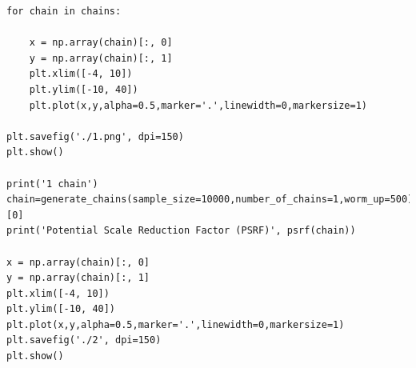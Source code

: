 \documentclass{article}
\begin{document}
\begin{verbatim}
for chain in chains:

    x = np.array(chain)[:, 0]
    y = np.array(chain)[:, 1]
    plt.xlim([-4, 10])
    plt.ylim([-10, 40])
    plt.plot(x,y,alpha=0.5,marker='.',linewidth=0,markersize=1)
  
plt.savefig('./1.png', dpi=150)
plt.show()

print('1 chain')
chain=generate_chains(sample_size=10000,number_of_chains=1,worm_up=500)[0]
print('Potential Scale Reduction Factor (PSRF)', psrf(chain))

x = np.array(chain)[:, 0]
y = np.array(chain)[:, 1]
plt.xlim([-4, 10])
plt.ylim([-10, 40])
plt.plot(x,y,alpha=0.5,marker='.',linewidth=0,markersize=1)
plt.savefig('./2', dpi=150)
plt.show()
\end{verbatim}
\end{document}
